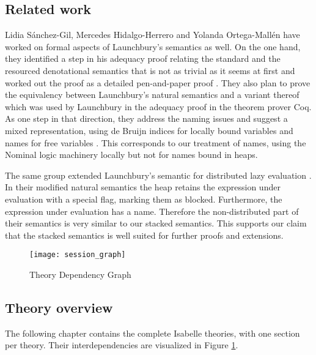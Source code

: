 \documentclass[11pt,a4paper,parskip=half]{scrartcl}
\begin{document}
\subsection{Related work}

Lidia Sánchez-Gil, Mercedes Hidalgo-Herrero and Yolanda Ortega-Mallén have worked on formal aspects of Launchbury’s semantics as well. On the one hand, they identified a step in his adequacy proof relating the standard and the resourced denotational semantics that is not as trivial as it seems at first and worked out the proof as a detailed pen-and-paper proof \cite{functionspaces}. They also plan to prove the equivalency between Launchbury’s natural semantics and a variant thereof which was used by Launchbury in the adequacy proof in the theorem prover Coq. As one step in that direction, they address the naming issues and suggest a mixed representation, using de Bruijn indices for locally bound variables and names for free variables \cite{nameless}. This corresponds to our treatment of names, using the Nominal logic machinery locally but not for names bound in heaps.

The same group extended Launchbury’s semantic for distributed lazy evaluation \cite{distributed}. In their modified natural semantics the heap retains the expression under evaluation with a special flag, marking them as blocked. Furthermore, the expression under evaluation has a name. Therefore the non-distributed part of their semantics is very similar to our stacked semantics. This supports our claim that the stacked semantics is well suited for further proofs and extensions.

\begin{figure}
\begin{center}
  \texttt{[image: session\_graph]}
\end{center}
\caption{Theory Dependency Graph\label{theory-deps}}
\end{figure}

\subsection{Theory overview}

The following chapter contains the complete Isabelle theories, with one section per theory. Their interdependencies are visualized in Figure \ref{theory-deps}.
\end{document}
